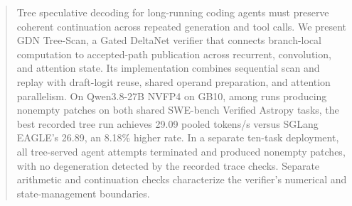 \begin{abstract}
Tree speculative decoding for long-running coding agents must preserve coherent continuation across repeated generation and tool calls. We present GDN Tree-Scan, a Gated DeltaNet verifier that connects branch-local computation to accepted-path publication across recurrent, convolution, and attention state. Its implementation combines sequential scan and replay with draft-logit reuse, shared operand preparation, and attention parallelism. On Qwen3.8-27B NVFP4 on GB10, among runs producing nonempty patches on both shared SWE-bench Verified Astropy tasks, the best recorded tree run achieves 29.09 pooled tokens/s versus SGLang EAGLE's 26.89, an 8.18\% higher rate. In a separate ten-task deployment, all tree-served agent attempts terminated and produced nonempty patches, with no degeneration detected by the recorded trace checks. Separate arithmetic and continuation checks characterize the verifier's numerical and state-management boundaries.
\end{abstract}
